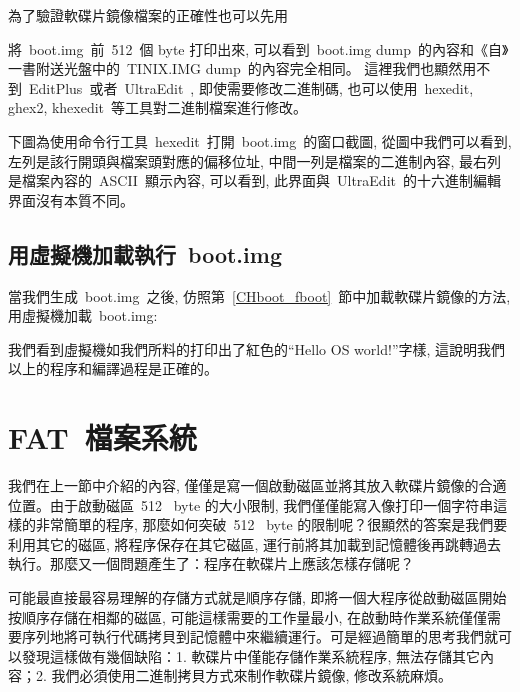 為了驗證軟碟片鏡像檔案的正確性也可以先用
將~boot.img~前~512~個 byte 打印出來, 可以看到~boot.img dump~的內容和《自》一書附送光盤中的~TINIX.IMG dump~的內容完全相同。
這裡我們也顯然用不到~EditPlus~或者~UltraEdit~, 即使需要修改二進制碼, 也可以使用~hexedit, ghex2, khexedit~等工具對二進制檔案進行修改。

下圖為使用命令行工具~hexedit~打開~boot.img~的窗口截圖, 從圖中我們可以看到, 左列是該行開頭與檔案頭對應的偏移位址, 中間一列是檔案的二進制內容, 最右列是檔案內容的~ASCII~顯示內容, 可以看到, 此界面與~UltraEdit~的十六進制編輯界面沒有本質不同。



\subsection{用虛擬機加載執行~boot.img}

當我們生成~boot.img~之後, 仿照第~\ref{CHboot_fboot}~節中加載軟碟片鏡像的方法, 用虛擬機加載~boot.img:\\


我們看到虛擬機如我們所料的打印出了紅色的“Hello OS world!”字樣, 這說明我們以上的程序和編譯過程是正確的。

\section{FAT~檔案系統}

我們在上一節中介紹的內容, 僅僅是寫一個啟動磁區並將其放入軟碟片鏡像的合適位置。由于啟動磁區~512~ byte 的大小限制, 我們僅僅能寫入像打印一個字符串這樣的非常簡單的程序, 那麼如何突破~512~ byte 的限制呢？很顯然的答案是我們要利用其它的磁區, 將程序保存在其它磁區, 運行前將其加載到記憶體後再跳轉過去執行。那麼又一個問題產生了：程序在軟碟片上應該怎樣存儲呢？

可能最直接最容易理解的存儲方式就是順序存儲, 即將一個大程序從啟動磁區開始按順序存儲在相鄰的磁區, 可能這樣需要的工作量最小, 在啟動時作業系統僅僅需要序列地將可執行代碼拷貝到記憶體中來繼續運行。可是經過簡單的思考我們就可以發現這樣做有幾個缺陷：1. 軟碟片中僅能存儲作業系統程序, 無法存儲其它內容；2. 我們必須使用二進制拷貝方式來制作軟碟片鏡像, 修改系統麻煩。

